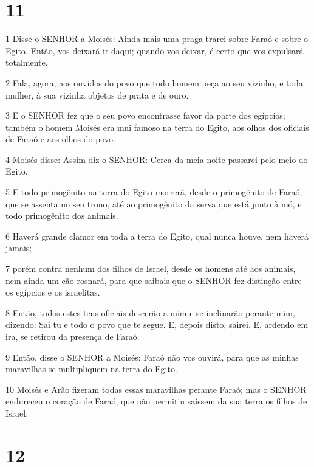 \chapter{11}

\par 1 Disse o SENHOR a Moisés: Ainda mais uma praga trarei sobre Faraó e sobre o Egito. Então, vos deixará ir daqui; quando vos deixar, é certo que vos expulsará totalmente.
\par 2 Fala, agora, aos ouvidos do povo que todo homem peça ao seu vizinho, e toda mulher, à sua vizinha objetos de prata e de ouro.
\par 3 E o SENHOR fez que o seu povo encontrasse favor da parte dos egípcios; também o homem Moisés era mui famoso na terra do Egito, aos olhos dos oficiais de Faraó e aos olhos do povo.
\par 4 Moisés disse: Assim diz o SENHOR: Cerca da meia-noite passarei pelo meio do Egito.
\par 5 E todo primogênito na terra do Egito morrerá, desde o primogênito de Faraó, que se assenta no seu trono, até ao primogênito da serva que está junto à mó, e todo primogênito dos animais.
\par 6 Haverá grande clamor em toda a terra do Egito, qual nunca houve, nem haverá jamais;
\par 7 porém contra nenhum dos filhos de Israel, desde os homens até aos animais, nem ainda um cão rosnará, para que saibais que o SENHOR fez distinção entre os egípcios e os israelitas.
\par 8 Então, todos estes teus oficiais descerão a mim e se inclinarão perante mim, dizendo: Sai tu e todo o povo que te segue. E, depois disto, sairei. E, ardendo em ira, se retirou da presença de Faraó.
\par 9 Então, disse o SENHOR a Moisés: Faraó não vos ouvirá, para que as minhas maravilhas se multipliquem na terra do Egito.
\par 10 Moisés e Arão fizeram todas essas maravilhas perante Faraó; mas o SENHOR endureceu o coração de Faraó, que não permitiu saíssem da sua terra os filhos de Israel.

\chapter{12}

